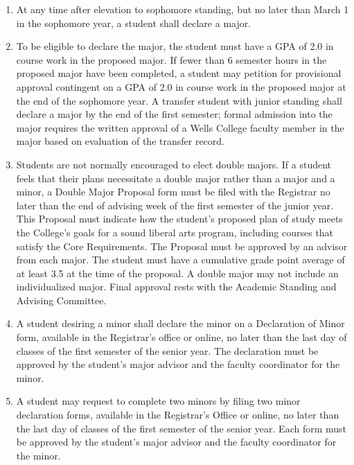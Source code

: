 \documentclass{manual}
\newcommand{\modified}[1]{}
\newcommand{\editRemove}[1]{}
\newcommand{\they}{(pronoun)~ }
\newcommand{\itemLevelA}{\alph*.}
\newcommand{\itemRefA}{\alph*}
\begin{document}
\begin{enumerate}[label=\itemLevelA,ref=\itemRefA]
\item At any time after elevation to sophomore standing, but no later than\modified{11/12/01} March 1 in the sophomore year, a student shall declare a major.

\item To be eligible to declare the major, the student must have a GPA of 2.0\modified{5/13/93} in course work in the proposed major. If \editRemove{\they has} fewer than 6 semester hours in the proposed major have been completed, a student may petition for provisional approval contingent on a GPA of 2.0 in course work in the proposed major at the end of the sophomore year. A transfer student with junior standing shall declare a major by the end of the first semester; formal admission into the major requires the written approval of a Wells College faculty member in the major based on evaluation of the transfer record.

\item Students are not normally encouraged to elect double majors. If a student \modified{10/17/00} feels that their plans necessitate a double major rather than a major and a minor, \editRemove{\they must file} a Double Major Proposal form must be filed with the Registrar no later than the \modified{9/9/2003}
end of advising week of the first semester of the junior year. This Proposal must indicate how the student's proposed plan of study meets the College's goals for a sound liberal arts program, including courses that satisfy the Core Requirements. The Proposal must be approved by an advisor from each major. The student must have a cumulative grade point average of at least 3.5 at the time of the proposal. A double major may not include an individualized major. Final approval rests with the Academic Standing and Advising Committee.

\item A student desiring a minor shall declare the minor on a Declaration of Minor\modified{4/8/03} form, available in the Registrar's office or online, no later than\modified{5/08/12} the last day of classes of the first semester of the senior year. The declaration must be approved by the student's major advisor and the faculty coordinator for the minor.

\item A student may request to complete two minors by filing two minor declaration forms, available in the Registrar's Office or online, no later than the last day of classes of the first semester of the senior year. Each form must be approved by the student's major advisor and the faculty coordinator for the minor.
\end{enumerate}
\end{document}
